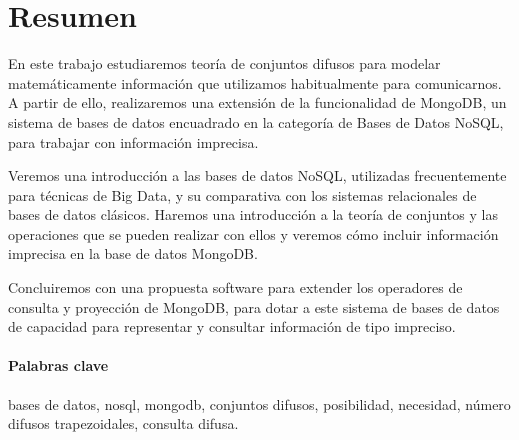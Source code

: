 \section{Resumen}

En este trabajo estudiaremos teoría de conjuntos difusos para modelar matemáticamente información que utilizamos habitualmente para comunicarnos. A partir de ello, realizaremos una extensión de la funcionalidad de MongoDB, un sistema de bases de datos encuadrado en la categoría de Bases de Datos NoSQL, para trabajar con información imprecisa.

Veremos una introducción a las bases de datos NoSQL, utilizadas frecuentemente para técnicas de Big Data, y su comparativa con los sistemas relacionales de bases de datos clásicos. Haremos una introducción a la teoría de conjuntos y las operaciones que se pueden realizar con ellos y veremos cómo incluir información imprecisa en la base de datos MongoDB.

Concluiremos con una propuesta software para extender los operadores de consulta y proyección de MongoDB, para dotar a este sistema de bases de datos de capacidad para representar y consultar información de tipo impreciso.

\paragraph{Palabras clave} bases de datos, nosql, mongodb, conjuntos difusos, posibilidad, necesidad, número difusos trapezoidales, consulta difusa.

\newpage
